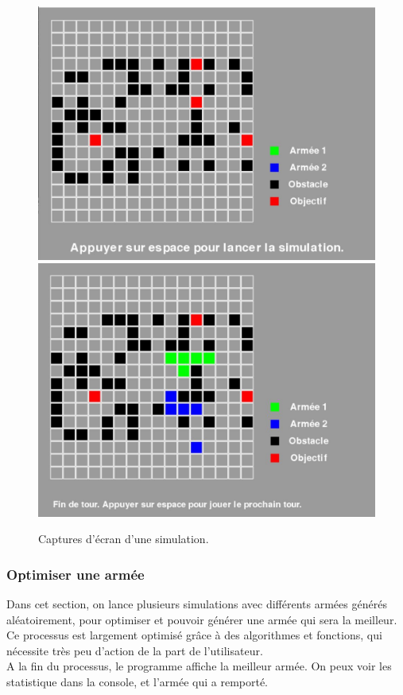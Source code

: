 \documentclass[a4paper, 11pt]{article}
\begin{document}
\begin{figure}[!htbp]

\includegraphics[scale=0.3]{Simulation-Start}
\includegraphics[scale=0.3]{Simulation-InProgress}

\caption{Captures d'écran d'une simulation.}

\end{figure}

\subsubsection{Optimiser une armée}

Dans cet section, on lance plusieurs simulations avec différents armées générés aléatoirement, pour optimiser et pouvoir générer une armée qui sera la meilleur.
Ce processus est largement optimisé grâce à des algorithmes et fonctions, qui nécessite très peu d'action de la part de l'utilisateur. \\
A la fin du processus, le programme affiche la meilleur armée. 
On peux voir les statistique dans la console, et l'armée qui a remporté. 
\end{document}
